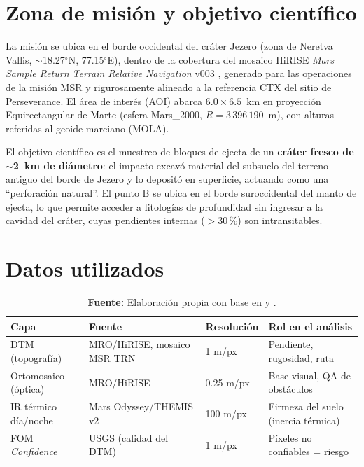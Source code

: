 \documentclass{article}
\begin{document}
\section{Zona de misión y objetivo científico}

La misión se ubica en el borde occidental del cráter Jezero (zona de Neretva Vallis, $\sim$18.27$^{\circ}$N, 77.15$^{\circ}$E), dentro de la cobertura del mosaico HiRISE \emph{Mars Sample Return Terrain Relative Navigation} v003 \citep{usgs2024}, generado para las operaciones de la misión MSR y rigurosamente alineado a la referencia CTX del sitio de Perseverance. El área de interés (AOI) abarca $6.0 \times 6.5$~km en proyección Equirectangular de Marte (esfera Mars\_2000, $R = 3\,396\,190$~m), con alturas referidas al geoide marciano (MOLA).

El objetivo científico es el muestreo de bloques de ejecta de un \textbf{cráter fresco de $\sim$2~km de diámetro}: el impacto excavó material del subsuelo del terreno antiguo del borde de Jezero y lo depositó en superficie, actuando como una ``perforación natural''. El punto B se ubica en el borde suroccidental del manto de ejecta, lo que permite acceder a litologías de profundidad sin ingresar a la cavidad del cráter, cuyas pendientes internas ($>30\,\%$) son intransitables.

\newpage

\section{Datos utilizados}

\begin{table}[H]
\centering
\caption{Capas de datos integradas en el análisis (cuatro tipos, tres instrumentos).}
\label{tab:datos}
\small
\begin{tabular}{p{3.6cm} p{5.2cm} p{2.2cm} p{4.2cm}}
\toprule
\textbf{Capa} & \textbf{Fuente} & \textbf{Resolución} & \textbf{Rol en el análisis} \\
\midrule
DTM (topografía) & MRO/HiRISE, mosaico MSR TRN & 1 m/px & Pendiente, rugosidad, ruta \\
Ortomosaico (óptica) & MRO/HiRISE & 0.25 m/px & Base visual, QA de obstáculos \\
IR térmico día/noche & Mars Odyssey/THEMIS v2 & 100 m/px & Firmeza del suelo (inercia térmica) \\
FOM \emph{Confidence} & USGS (calidad del DTM) & 1 m/px & Píxeles no confiables = riesgo \\
\bottomrule
\end{tabular}
\caption*{\textbf{Fuente:} Elaboración propia con base en \citet{usgs2024} y \citet{usgs2018}.}
\end{table}
\end{document}
